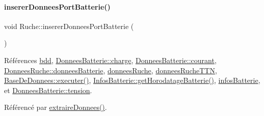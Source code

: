 \paragraph{\texorpdfstring{inserer\+Donnees\+Port\+Batterie()}{insererDonneesPortBatterie()}}
{\footnotesize\ttfamily void Ruche\+::inserer\+Donnees\+Port\+Batterie (\begin{DoxyParamCaption}{ }\end{DoxyParamCaption})\hspace{0.3cm}{\ttfamily [private]}}



Références \hyperlink{class_ruche_a8577fdedabdecd98652e338e83bb3b65}{bdd}, \hyperlink{struct_donnees_batterie_a4d3cf76cf1722835a6449bc4a29e761b}{Donnees\+Batterie\+::charge}, \hyperlink{struct_donnees_batterie_a7a996ea5eacd6839a8a34dbbe48eb59a}{Donnees\+Batterie\+::courant}, \hyperlink{struct_donnees_ruche_a67dc57b9568529e595a5a31e93eef703}{Donnees\+Ruche\+::donnees\+Batterie}, \hyperlink{class_ruche_a1526bfa78f03e0710ad16f880a40c15f}{donnees\+Ruche}, \hyperlink{class_ruche_a4556832042641c08a6ef2ab9d80d771e}{donnees\+Ruche\+T\+TN}, \hyperlink{class_base_de_donnees_aa8de5f8f8bb17edc43f5c0ee33712081}{Base\+De\+Donnees\+::executer()}, \hyperlink{class_infos_batterie_aeac9a7bcd953444f4f2302d7949c74ef}{Infos\+Batterie\+::get\+Horodatage\+Batterie()}, \hyperlink{class_ruche_af34340e456aff54c8d1ec433fdbe0740}{infos\+Batterie}, et \hyperlink{struct_donnees_batterie_a1394510ba159a846820452e9e333f38b}{Donnees\+Batterie\+::tension}.



Référencé par \hyperlink{class_ruche_a21c0dafeaec03d451590037343e6a3ca}{extraire\+Donnees()}.


